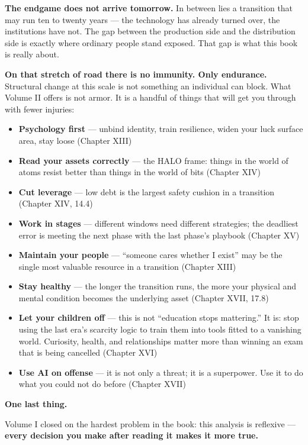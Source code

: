 \documentclass[11pt,a4paper]{article}
\begin{document}
\textbf{The endgame does not arrive tomorrow.} In between lies a transition that may run ten to twenty years --- the technology has already turned over, the institutions have not. The gap between the production side and the distribution side is exactly where ordinary people stand exposed. That gap is what this book is really about.

\textbf{On that stretch of road there is no immunity. Only endurance.} Structural change at this scale is not something an individual can block. What Volume II offers is not armor. It is a handful of things that will get you through with fewer injuries:

\begin{itemize}
  \item \textbf{Psychology first} --- unbind identity, train resilience, widen your luck surface area, stay loose (Chapter XIII)
  \item \textbf{Read your assets correctly} --- the HALO frame: things in the world of atoms resist better than things in the world of bits (Chapter XIV)
  \item \textbf{Cut leverage} --- low debt is the largest safety cushion in a transition (Chapter XIV, 14.4)
  \item \textbf{Work in stages} --- different windows need different strategies; the deadliest error is meeting the next phase with the last phase's playbook (Chapter XV)
  \item \textbf{Maintain your people} --- ``someone cares whether I exist'' may be the single most valuable resource in a transition (Chapter XIII)
  \item \textbf{Stay healthy} --- the longer the transition runs, the more your physical and mental condition becomes the underlying asset (Chapter XVII, 17.8)
  \item \textbf{Let your children off} --- this is not ``education stops mattering.'' It is: stop using the last era's scarcity logic to train them into tools fitted to a vanishing world. Curiosity, health, and relationships matter more than winning an exam that is being cancelled (Chapter XVI)
  \item \textbf{Use AI on offense} --- it is not only a threat; it is a superpower. Use it to do what you could not do before (Chapter XVII)
\end{itemize}

\textbf{One last thing.}

Volume I closed on the hardest problem in the book: this analysis is reflexive --- \textbf{every decision you make after reading it makes it more true.}
\end{document}
